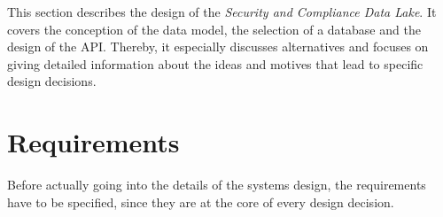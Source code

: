 
This section describes the design of the \textit{Security and Compliance Data Lake}. It covers the conception of the data model, the selection of a database and the design of the API. Thereby, it especially discusses alternatives and focuses on giving detailed information about the ideas and motives that lead to specific design decisions.

\section{Requirements}
Before actually going into the details of the systems design, the requirements have to be specified, since they are at the core of every design decision.  

